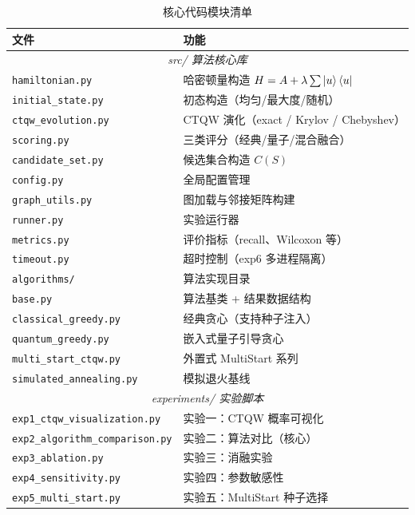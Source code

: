 \documentclass[pre,twocolumn]{revtex4-2}
\begin{document}
\begin{table}[H]
\caption{核心代码模块清单}
\label{tbl:code_index}
\centering
\begin{tabular}{lp{4.2cm}}
\hline\hline
\textbf{文件} & \textbf{功能} \\
\hline
\multicolumn{2}{c}{\textit{src/ 算法核心库}} \\
\hline
\texttt{hamiltonian.py}     & 哈密顿量构造 $H=A+\lambda\sum\ket{u}\bra{u}$ \\
\texttt{initial\_state.py}  & 初态构造（均匀/最大度/随机） \\
\texttt{ctqw\_evolution.py} & CTQW 演化（exact / Krylov / Chebyshev） \\
\texttt{scoring.py}         & 三类评分（经典/量子/混合融合） \\
\texttt{candidate\_set.py}   & 候选集合构造 $C(S)$ \\
\texttt{config.py}          & 全局配置管理 \\
\texttt{graph\_utils.py}     & 图加载与邻接矩阵构建 \\
\texttt{runner.py}          & 实验运行器 \\
\texttt{metrics.py}         & 评价指标（recall、Wilcoxon 等） \\
\texttt{timeout.py}         & 超时控制（exp6 多进程隔离） \\
\texttt{algorithms/}        & 算法实现目录 \\
\quad\texttt{base.py}             & 算法基类 + 结果数据结构 \\
\quad\texttt{classical\_greedy.py} & 经典贪心（支持种子注入） \\
\quad\texttt{quantum\_greedy.py}   & 嵌入式量子引导贪心 \\
\quad\texttt{multi\_start\_ctqw.py}& 外置式 MultiStart 系列 \\
\quad\texttt{simulated\_annealing.py} & 模拟退火基线 \\
\hline
\multicolumn{2}{c}{\textit{experiments/ 实验脚本}} \\
\hline
\texttt{exp1\_ctqw\_visualization.py}  & 实验一：CTQW 概率可视化 \\
\texttt{exp2\_algorithm\_comparison.py}& 实验二：算法对比（核心） \\
\texttt{exp3\_ablation.py}            & 实验三：消融实验 \\
\texttt{exp4\_sensitivity.py}         & 实验四：参数敏感性 \\
\texttt{exp5\_multi\_start.py}         & 实验五：MultiStart 种子选择 \\

\end{tabular}
\end{table}
\end{document}

